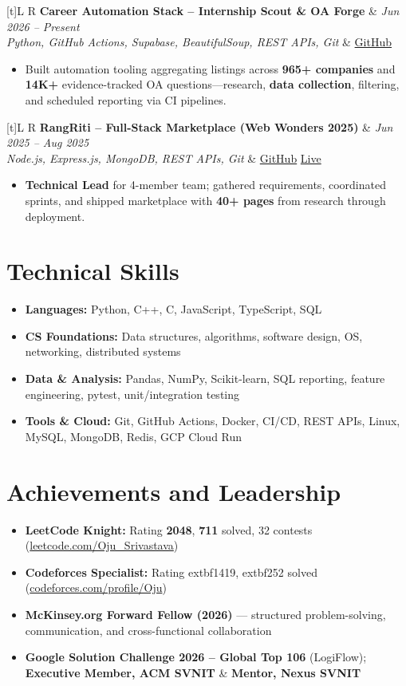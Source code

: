 \documentclass[a4paper,10pt]{article}
\newcommand{\resumeProject}[4]{
  \vspace{0.5mm}
  \noindent
  \begin{tabularx}{\textwidth}[t]{L R}
    \textbf{#1} & \textit{#3} \\
    \textit{#2} & #4 \\
  \end{tabularx}
  \vspace{-0.5mm}
}
\begin{document}
\resumeProject
  {Career Automation Stack -- Internship Scout \& OA Forge}
  {Python, GitHub Actions, Supabase, BeautifulSoup, REST APIs, Git}
  {Jun 2026 -- Present}
  {\href{https://github.com/Ojas-Srivastava05/resume-optimiser}{GitHub}}
\begin{itemize}
  \item Built automation tooling aggregating listings across \textbf{965+ companies} and \textbf{14K+} evidence-tracked OA questions---research, \textbf{data collection}, filtering, and scheduled reporting via CI pipelines.
\end{itemize}

\resumeProject
  {RangRiti -- Full-Stack Marketplace (Web Wonders 2025)}
  {Node.js, Express.js, MongoDB, REST APIs, Git}
  {Jun 2025 -- Aug 2025}
  {\href{https://github.com/Ojas-Srivastava05/RangRiti}{GitHub} \textbar{} \href{https://rangriti.onrender.com/}{Live}}
\begin{itemize}
  \item \textbf{Technical Lead} for 4-member team; gathered requirements, coordinated sprints, and shipped marketplace with \textbf{40+ pages} from research through deployment.
\end{itemize}

\section{Technical Skills}
\small
\begin{itemize}[label={}]
  \item \textbf{Languages:} Python, C++, C, JavaScript, TypeScript, SQL
  \item \textbf{CS Foundations:} Data structures, algorithms, software design, OS, networking, distributed systems
  \item \textbf{Data \& Analysis:} Pandas, NumPy, Scikit-learn, SQL reporting, feature engineering, pytest, unit/integration testing
  \item \textbf{Tools \& Cloud:} Git, GitHub Actions, Docker, CI/CD, REST APIs, Linux, MySQL, MongoDB, Redis, GCP Cloud Run
\end{itemize}

\section{Achievements and Leadership}
\small
\begin{itemize}
  \item \textbf{LeetCode Knight:} Rating \textbf{2048}, \textbf{711} solved, 32 contests (\href{https://leetcode.com/Oju_Srivastava}{leetcode.com/Oju\_Srivastava})
  \item \textbf{Codeforces Specialist:} Rating 	extbf{1419}, 	extbf{252} solved (\href{https://codeforces.com/profile/Oju}{codeforces.com/profile/Oju})
  \item \textbf{McKinsey.org Forward Fellow (2026)} --- structured problem-solving, communication, and cross-functional collaboration
  \item \textbf{Google Solution Challenge 2026 -- Global Top 106} (LogiFlow); \textbf{Executive Member, ACM SVNIT} \& \textbf{Mentor, Nexus SVNIT}
\end{itemize}
\end{document}
